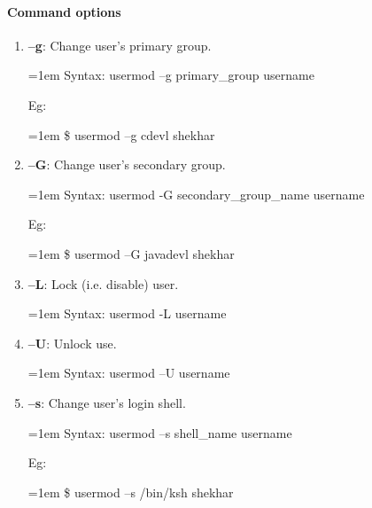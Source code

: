 \begin{flushleft}
	\paragraph{Command options}
	\begin{enumerate}[label=(\alph*)]
		\item \textbf{–g}: Change user's primary group.
		\bigskip
		\begin{tcolorbox}[breakable,notitle,boxrule=0pt,colback=pink,colframe=pink]
			\color{black}
			\font=1em
			Syntax: usermod –g primary\_group username
			\font=4pt
		\end{tcolorbox}
		Eg:
		\bigskip
		\begin{tcolorbox}[breakable,notitle,boxrule=-0pt,colback=black,colframe=black]
			\color{green}
			\font=1em
			\$ usermod –g cdevl shekhar
			\font=4pt
		\end{tcolorbox}
		
		\item \textbf{–G}: Change user's secondary group.
		\bigskip
		\begin{tcolorbox}[breakable,notitle,boxrule=0pt,colback=pink,colframe=pink]
			\color{black}
			\font=1em
			Syntax: usermod -G secondary\_group\_name username
			\font=4pt
		\end{tcolorbox}
		Eg:
		\bigskip
		\begin{tcolorbox}[breakable,notitle,boxrule=-0pt,colback=black,colframe=black]
			\color{green}
			\font=1em
			\$ usermod –G javadevl shekhar
			\font=4pt
		\end{tcolorbox}
		
		
		\item \textbf{–L}: Lock (i.e. disable) user.
		\bigskip
		\begin{tcolorbox}[breakable,notitle,boxrule=0pt,colback=pink,colframe=pink]
			\color{black}
			\font=1em
			Syntax: usermod -L username
			\font=4pt
		\end{tcolorbox}		
		
		\item \textbf{–U}: Unlock use.
		\bigskip
		\begin{tcolorbox}[breakable,notitle,boxrule=0pt,colback=pink,colframe=pink]
			\color{black}
			\font=1em
			Syntax: usermod –U username
			\font=4pt
		\end{tcolorbox}
		
		\item \textbf{–s}: Change user's login shell.
		\bigskip
		\begin{tcolorbox}[breakable,notitle,boxrule=0pt,colback=pink,colframe=pink]
			\color{black}
			\font=1em
			Syntax: usermod –s shell\_name username
			\font=4pt
		\end{tcolorbox}
		Eg:
		\bigskip
		\begin{tcolorbox}[breakable,notitle,boxrule=-0pt,colback=black,colframe=black]
			\color{green}
			\font=1em
			\$ usermod –s /bin/ksh shekhar
			\font=4pt
		\end{tcolorbox}
	

\end{enumerate}
\end{flushleft}
